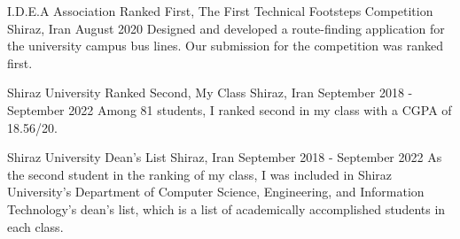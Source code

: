 

\begin{cventries}

  \cventry
    {I.D.E.A Association} %
    {Ranked First, The First Technical Footsteps Competition} %
    {Shiraz, Iran} %
    {August 2020} %
    {
      Designed and developed a route-finding application for the university campus bus lines. Our submission for the competition was ranked first. 
    }

  \cventry
    {Shiraz University} %
    {Ranked Second, My Class} %
    {Shiraz, Iran} %
    {September 2018 - September 2022} %
    {
      Among 81 students, I ranked second in my class with a CGPA of 18.56/20.
    }

  \cventry
    {Shiraz University} %
    {Dean’s List} %
    {Shiraz, Iran} %
    {September 2018 - September 2022} %
    {
      As the second student in the ranking of my class, I was included in Shiraz University’s Department of Computer Science, Engineering, and Information Technology’s dean’s list, which is a list of academically accomplished students in each class.
    }

\end{cventries}

